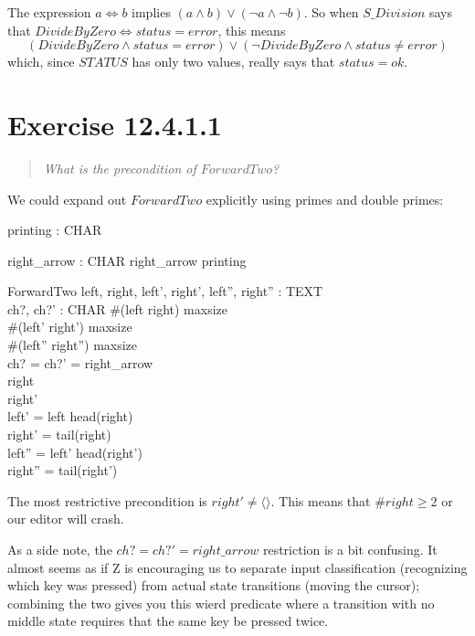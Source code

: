 \documentclass[10pt]{article}
\begin{document}
The expression $a \iff b$ implies $(a \land b) \lor (\lnot a \land \lnot b)$.  So when $S\_Division$
says that $DivideByZero \iff status = error$, this means 
\[ (DivideByZero \land status = error) \lor
   (\lnot DivideByZero \land status \neq error) \]
which, since $STATUS$ has only two values, really says that $status = ok$.
\tocheck


\section{Exercise 12.4.1.1}
\begin{quote}
  {\it
   What is the precondition of $ForwardTwo$? 
  }
\end{quote}

We could expand out $ForwardTwo$ explicitly using primes and double primes:

\begin{spec}
  \begin{axdef}
    printing : \power CHAR
  \end{axdef}
  \begin{axdef}
    right\_arrow : CHAR
    \where
    right\_arrow \notin printing
  \end{axdef}
  \begin{schema}{ForwardTwo}
    left, right, left', right', left'', right'' : TEXT \\
    ch?, ch?' : CHAR \where
    \#(left \cat right) \leq maxsize\\
    \#(left' \cat right') \leq maxsize\\
    \#(left'' \cat right'') \leq maxsize\\
    ch? = ch?' = right\_arrow \\
    right \neq \langle \rangle \\
    right' \neq \langle \rangle \\
    left' = left \cat \langle head(right)\rangle \\
    right' = tail(right) \\
    left'' = left' \cat \langle head(right')\rangle \\
    right'' = tail(right') \\
  \end{schema}
\end{spec}
The most restrictive precondition is $right' \neq \langle \rangle$.  This means that $\#right \geq
2$ or our editor will crash.

As a side note, the $ch? = ch?' = right\_arrow$ restriction is a bit confusing.  It almost seems as
if Z is encouraging us to separate input classification (recognizing which key was pressed) from
actual state transitions (moving the cursor); combining the two gives you this wierd predicate where
a transition with no middle state requires that the same key be pressed twice.
\end{document}
